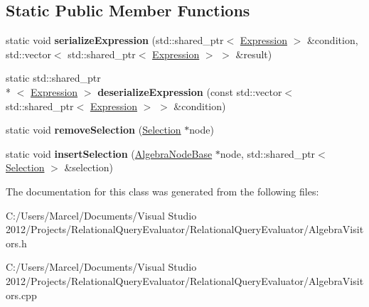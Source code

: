 \subsection*{Static Public Member Functions}
\begin{DoxyCompactItemize}
\item 
\hypertarget{class_algebra_visitor_aa8f4149dca3babdefa323050bb6e82f9}{static void {\bfseries serialize\+Expression} (std\+::shared\+\_\+ptr$<$ \hyperlink{class_expression}{Expression} $>$ \&condition, std\+::vector$<$ std\+::shared\+\_\+ptr$<$ \hyperlink{class_expression}{Expression} $>$ $>$ \&result)}\label{class_algebra_visitor_aa8f4149dca3babdefa323050bb6e82f9}

\item 
\hypertarget{class_algebra_visitor_a20d1215ba30361d19d0317a939a9b860}{static std\+::shared\+\_\+ptr\\*
$<$ \hyperlink{class_expression}{Expression} $>$ {\bfseries deserialize\+Expression} (const std\+::vector$<$ std\+::shared\+\_\+ptr$<$ \hyperlink{class_expression}{Expression} $>$ $>$ \&condition)}\label{class_algebra_visitor_a20d1215ba30361d19d0317a939a9b860}

\item 
\hypertarget{class_algebra_visitor_a78119cf006ac64137b8c29223ab77885}{static void {\bfseries remove\+Selection} (\hyperlink{class_selection}{Selection} $\ast$node)}\label{class_algebra_visitor_a78119cf006ac64137b8c29223ab77885}

\item 
\hypertarget{class_algebra_visitor_adbcb61f031cfc4808d150b076f6aa63d}{static void {\bfseries insert\+Selection} (\hyperlink{class_algebra_node_base}{Algebra\+Node\+Base} $\ast$node, std\+::shared\+\_\+ptr$<$ \hyperlink{class_selection}{Selection} $>$ \&selection)}\label{class_algebra_visitor_adbcb61f031cfc4808d150b076f6aa63d}

\end{DoxyCompactItemize}


The documentation for this class was generated from the following files\+:\begin{DoxyCompactItemize}
\item 
C\+:/\+Users/\+Marcel/\+Documents/\+Visual Studio 2012/\+Projects/\+Relational\+Query\+Evaluator/\+Relational\+Query\+Evaluator/Algebra\+Visitors.\+h\item 
C\+:/\+Users/\+Marcel/\+Documents/\+Visual Studio 2012/\+Projects/\+Relational\+Query\+Evaluator/\+Relational\+Query\+Evaluator/Algebra\+Visitors.\+cpp\end{DoxyCompactItemize}
